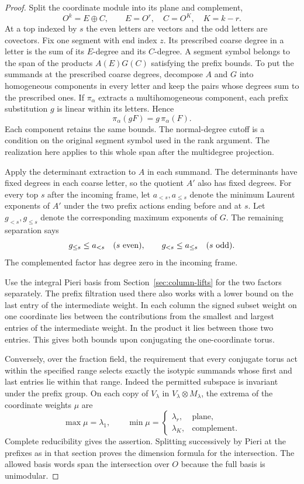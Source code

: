 \begin{proof}
Split the coordinate module into its plane and complement,
\[
 O^k=E\oplus C,\qquad E=O^r,\quad C=O^K,\quad K=k-r.
\]
At a top indexed by \(s\)
the even letters are vectors and the odd letters are covectors.
Fix one segment with end index \(z\). Its prescribed coarse
degree in a letter is the sum of its \(E\)-degree and its
\(C\)-degree. A segment symbol belongs to the span of the products \(A(E)G(C)\) satisfying the prefix bounds. To put the summands at the prescribed coarse
degrees, decompose \(A\) and \(G\) into homogeneous components
in every letter and keep the pairs whose degrees sum to the
prescribed ones. If \(\pi_\alpha\) extracts a multihomogeneous component, each prefix substitution \(g\) is linear within its letters. Hence
\[
 \pi_\alpha(gF)=g\,\pi_\alpha(F).
\]
Each component retains the same bounds. The
normal-degree cutoff is a condition on the original segment
symbol used in the rank argument. The realization here
applies to this whole span after the multidegree projection.

Apply the determinant extraction to \(A\) in each summand.
The determinants have fixed degrees in each coarse letter, so
the quotient \(A'\) also has fixed degrees. For every top \(s\)
after the incoming frame, let \(a_{<s},a_{\le s}\) denote the
minimum Laurent exponents of \(A'\) under the two prefix actions
ending before and at \(s\). Let \(g_{<s},g_{\le s}\) denote the
corresponding maximum exponents of \(G\). The remaining
separation says
\[
  g_{\le s}\le a_{<s}\quad(s\ {\rm even}),\qquad
  g_{<s}\le a_{\le s}\quad(s\ {\rm odd}).
\]
The complemented factor has degree zero in the incoming frame.

Use the integral Pieri basis from
Section~\ref{sec:column-lifts} for the two factors separately.
The prefix filtration used there also works with a lower
bound on the last entry of the intermediate weight. In each
column the signed subset weight on one coordinate lies
between the contributions from the smallest and largest
entries of the intermediate weight. In the product it lies
between those two entries. This gives both bounds upon
conjugating the one-coordinate torus.

Conversely, over the
fraction field, the requirement that every conjugate torus
act within the specified range selects exactly the isotypic
summands whose first and last entries lie within that range.
Indeed the permitted subspace is invariant under the prefix
group. On each copy of \(V_\lambda\) in \(V_\lambda\otimes M_\lambda\), the extrema of the coordinate weights \(\mu\) are
\[
 \max\mu=\lambda_1,\qquad \min\mu=\begin{cases}\lambda_r,&\text{plane},\\\lambda_K,&\text{complement}.\end{cases}
\]
Complete reducibility gives the assertion. Splitting
successively by Pieri at the prefixes as in that section proves
the dimension formula for the intersection. The allowed basis
words span the intersection over \(O\) because the full basis is
unimodular.


\end{proof}
